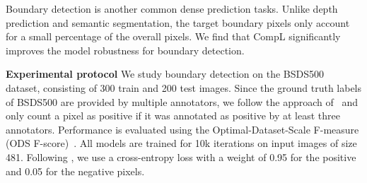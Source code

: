 \documentclass[10pt,twocolumn,letterpaper]{article}
\newcommand{\parsection}[1]{\vspace{1mm}\noindent\textbf{#1 }}
\begin{document}
Boundary detection is another common dense prediction tasks. 
Unlike depth prediction and semantic segmentation, the target boundary pixels only account for a small percentage of the overall pixels. 
We find that CompL significantly improves the model robustness for boundary detection.

\parsection{Experimental protocol}
We study boundary detection on the BSDS500~\cite{arbelaez2010contour} dataset, consisting of 300 train and 200 test images. Since the ground truth labels of BSDS500 are provided by multiple annotators, we follow the approach of~\cite{xie2015holistically} and only count a pixel as positive if it was annotated as positive by at least three annotators. Performance is evaluated using the Optimal-Dataset-Scale F-measure (ODS F-score)~\cite{martin2004learning}. All models are trained for 10k iterations on input images of size 481. Following \cite{xie2015holistically}, we use a cross-entropy loss with a weight of 0.95 for the positive and 0.05 for the negative pixels.


\begin{table*}[t]
  \center
    \caption{Performance of a multi-task model for monocular depth estimation in RMSE and semantic segmentation in mIoU on NYUD-v2. `+' denote joint training. The multi-task model combined with CompL yields consistent improvements in both tasks.}
\vspace{-0.1in}
  \label{table_sup:depth_semseg_joint_perf}
  \vspace{-0.2in}
\end{table*}
\end{document}
